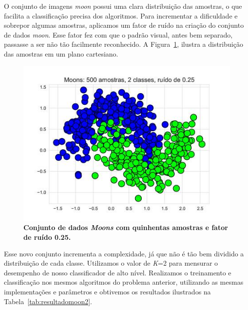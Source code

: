 \documentclass[
12pt,        %
oneside,     %
a4paper,     %
english,       %
brazil        %
%
%
]{ppgca}
\begin{document}
O conjunto de imagens \textit{moon} possui uma clara distribuição das amostras, o que facilita a classificação precisa dos algoritmos. Para incrementar a dificuldade e sobrepor algumas amostras, aplicamos um fator de ruído na criação do conjunto de dados \textit{moon}. Esse fator fez com que o padrão visual, antes bem separado, passasse a ser não tão facilmente reconhecido. A Figura~\ref{fig:artificial_moons_noise}, ilustra a distribuição das amostras em um plano cartesiano.

\begin{figure}[H]
    \includegraphics[scale=0.6]{artificial_moons_noise.png}
    \centering
    \caption{\textbf{Conjunto de dados \textit{Moons} com quinhentas amostras e fator de ruído 0.25.}}
    \label{fig:artificial_moons_noise}
\end{figure}

Esse novo conjunto incrementa a complexidade, já que não é tão bem dividido a distribuição de cada classe. Utilizamos o valor de \textit{K}=2 para mensurar o desempenho de nosso classificador de alto nível. Realizamos o treinamento e classificação nos mesmos algoritmos do problema anterior, utilizando as mesmas implementações e parâmetros e obtivemos os resultados ilustrados na Tabela~\ref{tab:resultadomoon2}.
\end{document}
